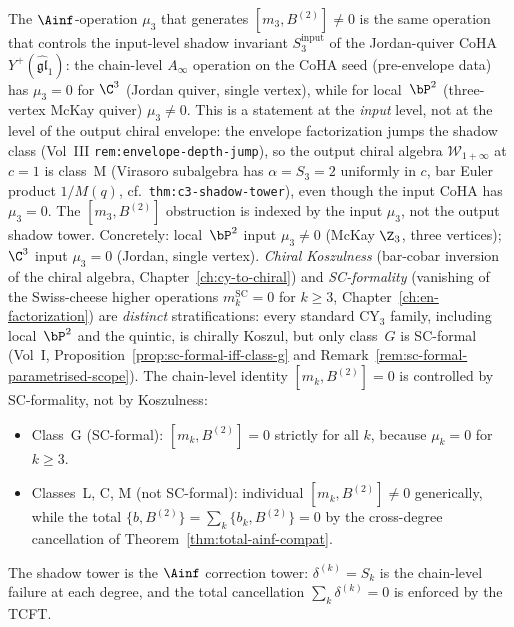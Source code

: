\begin{remark}
\label{rem:m3b2-shadow-tower}
The $\Ainf$-operation $\mu_3$ that generates
$[m_3, B^{(2)}] \neq 0$ is the same operation that controls
the input-level shadow invariant $S_3^{\mathrm{input}}$ of the
Jordan-quiver CoHA $Y^+(\widehat{\mathfrak{gl}}_1)$: the chain-level
$A_\infty$ operation on the CoHA seed (pre-envelope data) has
$\mu_3 = 0$ for $\C^3$ (Jordan quiver, single vertex), while for
local~$\bP^2$ (three-vertex McKay quiver) $\mu_3 \neq 0$.  This is
a statement at the \emph{input} level, not at the level of the output
chiral envelope: the envelope factorization jumps the shadow class
(Vol~III \texttt{rem:envelope-depth-jump}), so the output chiral
algebra $\mathcal{W}_{1+\infty}$ at $c = 1$ is class~M (Virasoro
subalgebra has $\alpha = S_3 = 2$ uniformly in $c$, bar Euler product
$1/M(q)$, cf.~\texttt{thm:c3-shadow-tower}), even though the input
CoHA has $\mu_3 = 0$.  The $[m_3, B^{(2)}]$ obstruction is indexed
by the input $\mu_3$, not the output shadow tower.
Concretely:
local~$\bP^2$ input $\mu_3 \neq 0$ (McKay $\Z_3$, three vertices);
$\C^3$ input $\mu_3 = 0$ (Jordan, single vertex).  \emph{Chiral Koszulness} (bar-cobar
inversion of the chiral algebra, Chapter~\ref{ch:cy-to-chiral})
and \emph{SC-formality} (vanishing of the Swiss-cheese higher
operations $m_k^{\mathrm{SC}} = 0$ for $k \geq 3$,
Chapter~\ref{ch:en-factorization}) are \emph{distinct}
stratifications: every standard CY$_3$ family, including
local~$\bP^2$ and the quintic, is chirally Koszul, but only
class~$G$ is SC-formal (Vol~I,
Proposition~\ref{prop:sc-formal-iff-class-g} and
Remark~\ref{rem:sc-formal-parametrised-scope}).  The chain-level identity
$[m_k, B^{(2)}] = 0$ is controlled by SC-formality, not by
Koszulness:
\begin{itemize}
 \item Class~G (SC-formal): $[m_k, B^{(2)}] = 0$ strictly for
  all $k$, because $\mu_k = 0$ for $k \geq 3$.
 \item Classes~L, C, M (not SC-formal): individual
  $[m_k, B^{(2)}] \neq 0$ generically, while the total
  $\{b, B^{(2)}\} = \sum_k \{b_k, B^{(2)}\} = 0$ by the
  cross-degree cancellation of
  Theorem~\ref{thm:total-ainf-compat}.
\end{itemize}
The shadow tower is the $\Ainf$ correction tower:
$\delta^{(k)} = S_k$ is the chain-level failure at each degree,
and the total cancellation $\sum_k \delta^{(k)} = 0$ is enforced
by the TCFT.
\end{remark}

